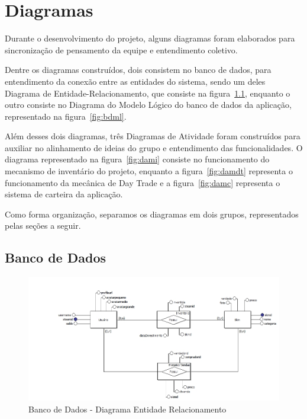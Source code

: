 \chapter[Diagramas]{Diagramas}
Durante o desenvolvimento do projeto, alguns diagramas foram elaborados para sincronização de pensamento da equipe e entendimento coletivo.

Dentre os diagramas construídos, dois consistem no banco de dados, para entendimento da conexão entre as entidades do sistema, sendo um deles Diagrama de Entidade-Relacionamento, que consiste na figura~\ref{fig:der}, enquanto o outro consiste no Diagrama do Modelo Lógico do banco de dados da aplicação, representado na figura~\ref{fig:bdml}.

Além desses dois diagramas, três Diagramas de Atividade foram construídos para auxiliar no alinhamento de ideias do grupo e entendimento das funcionalidades. O diagrama representado na figura~\ref{fig:dami} consiste no funcionamento do mecanismo de inventário do projeto, enquanto a figura~\ref{fig:damdt} representa o funcionamento da mecânica de Day Trade e a figura~\ref{fig:damc} representa o sistema de carteira da aplicação.

Como forma organização, separamos os diagramas em dois grupos, representados pelas seções a seguir.

 \section{Banco de Dados}

  \begin{figure}[!htb]
        \centering
        \includegraphics[scale=0.5]{Imagens/Relacionamento.png}
        \caption{Banco de Dados - Diagrama Entidade Relacionamento}
        \label{fig:der}
 \end{figure}

